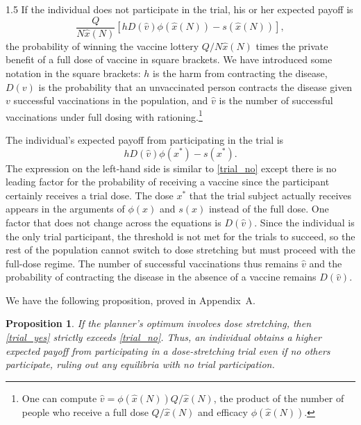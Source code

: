\documentclass[12pt]{article}
\newcommand{\efficacy}{\phi}
\newcommand{\side}{s}
\newcommand{\xh}{\hat{x}}
\newtheorem{proposition}{Proposition}
\begin{document}
\begin{spacing}{1.5}
If the individual does not participate in the trial, his or her expected payoff is 
\begin{equation}
\label{trial_no}
\frac{Q}{N \xh(N)} \left[ h D(\hat{v}) \efficacy(\xh(N)) - \side(\xh(N)) \right],
\end{equation}
the probability of winning the vaccine lottery $Q / N \xh(N)$ times the private benefit of a full dose of vaccine in square brackets. We have introduced some notation in the square brackets: $h$ is the harm from contracting the disease, $D(v)$ is the probability that an unvaccinated person contracts the disease given $v$ successful vaccinations in the population, and $\hat{v}$ is the number of successful vaccinations under full dosing with rationing.\footnote{One can compute $\hat{v} = \efficacy(\xh(N)) Q / \xh(N)$, the product of the number of people who receive a full dose $Q / \xh(N)$ and  efficacy $\efficacy(\xh(N))$.} 

The individual's expected payoff from participating in the trial is
\begin{equation}
\label{trial_yes}
h D(\hat{v}) \efficacy(x^*) - \side(x^*).
\end{equation}
The expression on the left-hand side is similar to \eqref{trial_no} except there is no leading factor for the probability of receiving a vaccine since the participant certainly receives a trial dose. The dose $x^*$ that the trial subject actually receives appears in the arguments of $\efficacy(x)$ and $\side(x)$ instead of the full dose. One factor that does not change across the equations is $D(\hat{v})$. Since the individual is the only trial participant, the threshold is not met for the trials to succeed, so the rest of the population cannot switch to dose stretching but must proceed with the full-dose regime. The number of successful vaccinations thus remains $\hat{v}$ and the probability of contracting the disease in the absence of a vaccine remains $D(\hat{v})$. 

We have the following proposition, proved in Appendix~A. 
\begin{proposition}
\label{p:trials}
\singlespace
If the planner's optimum involves dose stretching, then \eqref{trial_yes} strictly exceeds \eqref{trial_no}. Thus, an individual obtains a higher expected payoff from participating in a dose-stretching trial even if no others participate, ruling out any equilibria with no trial participation. 
\end{proposition}


\end{spacing}
\end{document}
